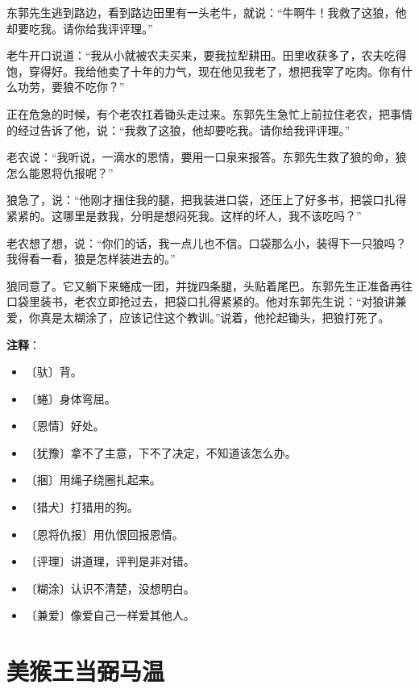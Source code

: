 \documentclass[12pt,UTF-8,openany]{ctexbook}
\begin{document}
\begin{large}
    东郭先生逃到路边，看到路边田里有一头老牛，就说：“牛啊牛！我救了这狼，他却要吃我。请你给我评评理。”
    
    老牛开口说道：“我从小就被农夫买来，要我拉犁耕田。田里收获多了，农夫吃得饱，穿得好。我给他卖了十年的力气，现在他见我老了，想把我宰了吃肉。你有什么功劳，要狼不吃你？”
    
    正在危急的时候，有个老农扛着锄头走过来。东郭先生急忙上前拉住老农，把事情的经过告诉了他，说：“我救了这狼，他却要吃我。请你给我评评理。”
    
    老农说：“我听说，一滴水的恩情，要用一口泉来报答。东郭先生救了狼的命，狼怎么能恩将仇报呢？”
    
    狼急了，说：“他刚才捆住我的腿，把我装进口袋，还压上了好多书，把袋口扎得紧紧的。这哪里是救我，分明是想闷死我。这样的坏人，我不该吃吗？”
    
    老农想了想，说：“你们的话，我一点儿也不信。口袋那么小，装得下一只狼吗？我得看一看，狼是怎样装进去的。”
    
    狼同意了。它又躺下来蜷成一团，并拢四条腿，头贴着尾巴。东郭先生正准备再往口袋里装书，老农立即抢过去，把袋口扎得紧紧的。他对东郭先生说：“对狼讲兼爱，你真是太糊涂了，应该记住这个教训。”说着，他抡起锄头，把狼打死了。
    
\end{large}


\newpage

\textbf{注释}：

\vspace{-1em}

\begin{itemize}
    \setlength\itemsep{-0.2em}
    \item 〔驮〕背。
    \item 〔蜷〕身体弯屈。
    \item 〔恩情〕好处。
    \item 〔犹豫〕拿不了主意，下不了决定，不知道该怎么办。
    \item 〔捆〕用绳子绕圈扎起来。
    \item 〔猎犬〕打猎用的狗。
    \item 〔恩将仇报〕用仇恨回报恩情。
    \item 〔评理〕讲道理，评判是非对错。
    \item 〔糊涂〕认识不清楚，没想明白。
    \item 〔兼爱〕像爱自己一样爱其他人。
\end{itemize}

\chapter{美猴王当弼马温}
\end{document}
